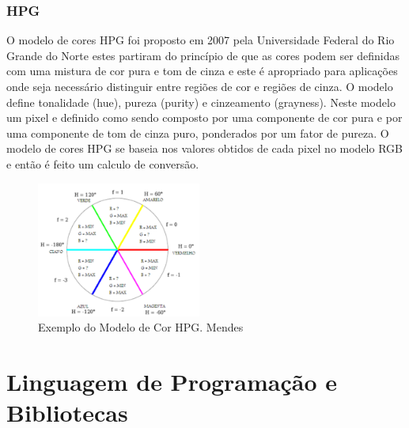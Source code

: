 \subsubsection{HPG} 

O modelo de cores HPG foi proposto em 2007 pela Universidade Federal do Rio Grande do Norte estes partiram do princípio de que as cores podem ser definidas com uma mistura de cor pura e tom de cinza\cite{Martins:2007} e este é apropriado para aplicações onde seja necessário distinguir entre regiões de cor e regiões de cinza\cite{Mendes:2008}. O modelo define tonalidade (hue), pureza (purity) e cinzeamento (grayness). Neste modelo um pixel e definido como sendo composto por uma componente de cor pura e por uma componente de tom de cinza puro, ponderados por um fator de pureza\cite{Mendes:2008}.
O modelo de cores HPG se baseia nos valores obtidos de cada pixel no modelo RGB e então é feito um calculo de conversão.
\begin{figure}[!h]
	\centering
	\includegraphics[width=0.48\textwidth]{hpg.pdf}
	\caption{Exemplo do Modelo de Cor HPG.  Mendes \cite{Mendes:2008}}
	\label{ModeloHPG}
\end{figure} 
\newpage
\section{Linguagem de Programação e Bibliotecas}


